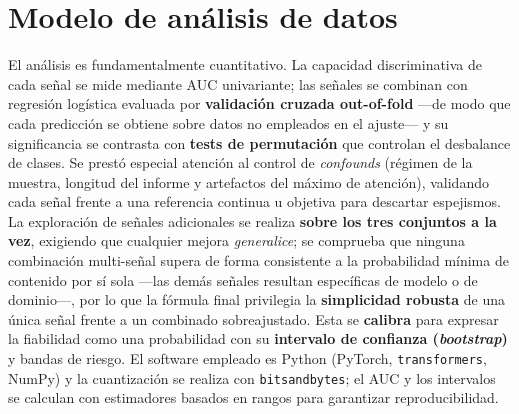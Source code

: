 \section{Modelo de análisis de datos}
El análisis es fundamentalmente cuantitativo. La capacidad discriminativa de cada señal se mide
mediante AUC univariante; las señales se combinan con regresión logística evaluada por
\textbf{validación cruzada out-of-fold} —de modo que cada predicción se obtiene sobre datos no
empleados en el ajuste— y su significancia se contrasta con \textbf{tests de permutación} que
controlan el desbalance de clases. Se prestó especial atención al control de \textit{confounds}
(régimen de la muestra, longitud del informe y artefactos del máximo de atención), validando cada
señal frente a una referencia continua u objetiva para descartar espejismos. La exploración de
señales adicionales se realiza \textbf{sobre los tres conjuntos a la vez}, exigiendo que cualquier
mejora \emph{generalice}; se comprueba que ninguna combinación multi-señal supera de forma
consistente a la probabilidad mínima de contenido por sí sola —las demás señales resultan específicas
de modelo o de dominio—, por lo que la fórmula final privilegia la \textbf{simplicidad robusta} de
una única señal frente a un combinado sobreajustado. Esta se \textbf{calibra} para expresar la
fiabilidad como una probabilidad con su \textbf{intervalo de confianza (\emph{bootstrap})} y bandas
de riesgo. El software empleado es Python (PyTorch, \texttt{transformers}, NumPy) y la cuantización se
realiza con \texttt{bitsandbytes}; el AUC y los intervalos se calculan con estimadores basados en
rangos para garantizar reproducibilidad.
